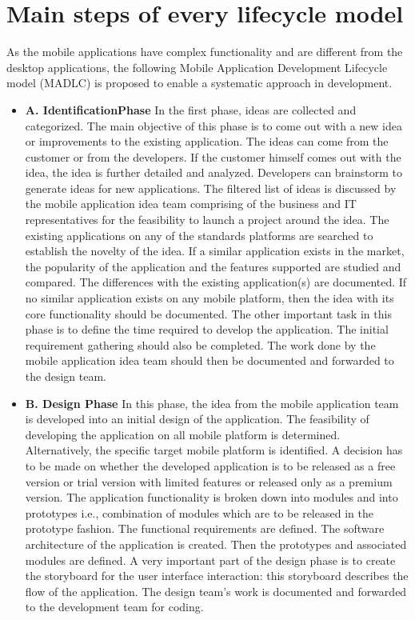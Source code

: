 \documentclass[10pt,slovak,a4paper]{article}
\begin{document}
\section{Main steps of every lifecycle model} 
As the mobile applications have complex functionality and are different from the desktop applications, the following Mobile Application Development Lifecycle model (MADLC) is proposed to enable a systematic approach in development.
\begin{itemize}
  \item \textbf{A. IdentificationPhase}
In the first phase, ideas are collected and categorized. The main objective of this phase is to come out with a new idea or improvements to the existing application. The ideas can come from the customer or from the developers.
If the customer himself comes out with the idea, the idea is further detailed and analyzed. Developers can brainstorm to generate ideas for new applications. The filtered list of ideas is discussed by the mobile application idea team comprising of the business and IT representatives for the feasibility to launch a project around the idea.
The existing applications on any of the standards platforms are searched to establish the novelty of the idea. If a similar application exists in the market, the popularity of the application and the features supported are studied and compared. The differences with the existing application(s) are documented. If no similar application exists on any mobile platform, then the idea with its core functionality should be documented. The other important task in this phase is to define the time required to develop the application. The initial requirement gathering should also be completed. The work done by the mobile application idea team should then be documented and forwarded to the design team.
  \item \textbf{B. Design Phase}
In this phase, the idea from the mobile application team is developed into an initial design of the application.
The feasibility of developing the application on all mobile platform is determined. Alternatively, the specific target mobile platform is identified. A decision has to be made on whether the developed application is to be released as a free version or trial version with limited features or released only as a premium version. The application functionality is broken down into modules and into prototypes i.e., combination of modules which are to be released in the prototype fashion. The functional requirements are defined. The software architecture of the application is created. Then the prototypes and associated modules are defined. A very important part of the design phase is to create the storyboard for the user interface interaction: this storyboard describes the flow of the application. The design team’s work is documented and forwarded to the development team for coding.

\end{itemize}
\end{document}
